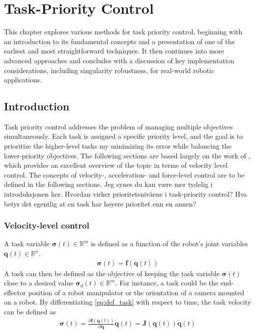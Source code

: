 \chapter{Task-Priority Control}

This chapter explores various methods for task priority control, beginning with
an introduction to its fundamental concepts and a presentation of one of the
earliest and most straightforward techniques. It then continues into more advanced
approaches and concludes with a discussion of key implementation considerations,
including singularity robustness, for real-world robotic applications.

\section{Introduction}
\label{sec:tpc_intro}
Task priority control addresses the problem of managing multiple objectives simultaneously.
Each task is assigned a specific priority level, and the goal is to prioritize the higher-level
tasks my minimizing its error while balancing the lower-priority objectives. The
following sections are based largely on the work of \cite{antonelli2009}, which provides
an excellent overview of the topic in terms of velocity level control. The concepts
of velocity-, acceleration- and force-level control are to be defined in the
following sections.
{\color{red}Jeg synes du kan være mer tydelig i introduksjonen her. Hvordan virker prioritetsnivåene i task-priority control? Hva betyr det egentlig at en task har høyere prioritet enn en annen?}

\subsection{Velocity-level control}

A task variable $\bm{\sigma}(t) \in \mathbb{R}^m$ is defined as a function of the robot's
joint variables $\bm{q}(t) \in \mathbb{R}^n$.
\begin{align}
    \bm{\sigma}(t) = \bm{f}(\bm{q}(t)) \label{eq:def_task}
\end{align}
A task can then be defined as the objective of keeping the task variable $\bm{\sigma}(t)$
close to a desired value $\bm{\sigma}_d(t) \in \mathbb{R}^m$. For instance, a task could
be the end-effector position of a robot manipulator or the orientation of a camera mounted
on a robot. By differentiating \autoref{eq:def_task} with respect to time, the task velocity
can be defined as
\begin{align}
    \dot{\bm{\sigma}}(t) = \frac{\partial \bm{f}(\bm{q}(t))}{\partial \bm{q}} \dot{\bm{q}}(t)= \bm{J}(\bm{q}(t)) \dot{\bm{q}}(t) \label{eq:def_task_jacobian}
\end{align}

